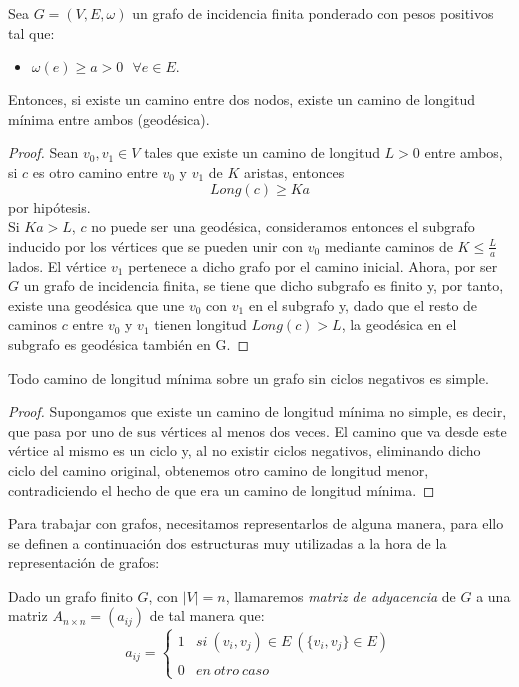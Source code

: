 \begin{proposicion}
	Sea $G=(V,E,\omega)$ un grafo de incidencia finita ponderado con pesos positivos tal que:
	\begin{itemize}
		\item $\omega (e)\geq a>0\ \ \ \forall e\in E.$
	\end{itemize}
	Entonces, si existe un camino entre dos nodos, existe un camino de longitud mínima entre ambos (geodésica).
\end{proposicion}

\begin{proof}
	Sean $v_0,v_1\in V$ tales que existe un camino de longitud $L>0$ entre ambos, si $c$ es otro camino entre $v_0$ y $v_1$ de $K$ aristas, entonces
	$$Long(c) \geq Ka$$
	por hipótesis.\\
	Si $Ka>L$, $c$ no puede ser una geodésica, consideramos entonces el subgrafo inducido por los vértices que se pueden unir con $v_0$ mediante caminos de $K\leq \frac{L}{a}$ lados. El vértice $v_1$ pertenece a dicho grafo por el camino inicial. Ahora, por ser $G$ un grafo de incidencia finita, se tiene que dicho subgrafo es finito y, por tanto, existe una geodésica que une $v_0$ con $v_1$ en el subgrafo y, dado que el resto de caminos $c$ entre $v_0$ y $v_1$ tienen longitud $Long(c) > L$, la geodésica en el subgrafo es geodésica también en G.
\end{proof}

\begin{proposicion}
	Todo camino de longitud mínima sobre un grafo sin ciclos negativos es simple.
\end{proposicion}

\begin{proof}
	Supongamos que existe un camino de longitud mínima no simple, es decir, que pasa por uno de sus vértices al menos dos veces. El camino que va desde este vértice al mismo es un ciclo y, al no existir ciclos negativos, eliminando dicho ciclo del camino original, obtenemos otro camino de longitud menor, contradiciendo el hecho de que era un camino de longitud mínima.
\end{proof}

Para trabajar con grafos, necesitamos representarlos de alguna manera, para ello se definen a continuación dos estructuras muy utilizadas a la hora de la representación de grafos:

\begin{definicion}
	Dado un grafo finito $G$, con $|V|=n$, llamaremos \textit{matriz de adyacencia} de $G$ a una matriz $A_{n\times n}=(a_{ij})$ de tal manera que:
	$$a_{ij}= \left\{ \begin{array}{lcc}
		1 &   si\ (v_i,v_j)\in E\ (\{v_i,v_j\}\in E) \\
		\\ 0 &  en\ otro\ caso
	\end{array}
	\right.$$
\end{definicion}


